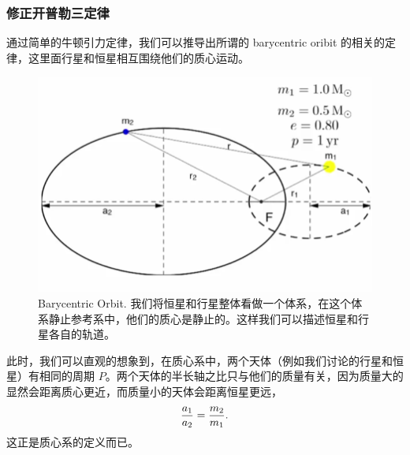\documentclass[letterpaper,10pt,english]{sphinxmanual}
\begin{document}
\subsubsection{修正开普勒三定律}
\label{orbits:id12}
通过简单的牛顿引力定律，我们可以推导出所谓的 barycentric oribit 的相关的定律，这里面行星和恒星相互围绕他们的质心运动。
\begin{figure}[htbp]
\centering
\capstart

\includegraphics{barycentricOrbit.png}
\caption{Barycentric Orbit. 我们将恒星和行星整体看做一个体系，在这个体系静止参考系中，他们的质心是静止的。这样我们可以描述恒星和行星各自的轨道。}\end{figure}

此时，我们可以直观的想象到，在质心系中，两个天体（例如我们讨论的行星和恒星）有相同的周期 \(P\)。两个天体的半长轴之比只与他们的质量有关，因为质量大的显然会距离质心更近，而质量小的天体会距离恒星更远，
\begin{gather}
\begin{split}\frac{a_1}{a_2} = \frac{m_2}{m_1}.\end{split}\notag
\end{gather}
这正是质心系的定义而已。
\end{document}

